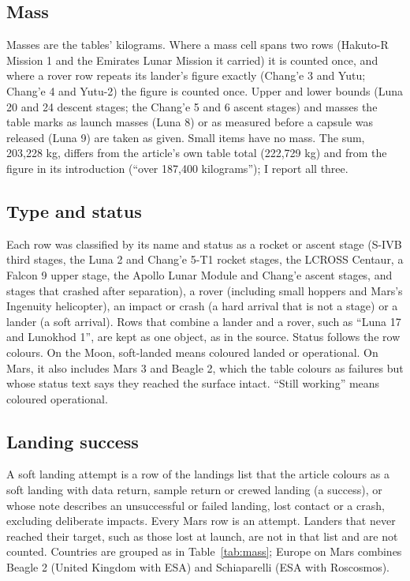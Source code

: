 \documentclass[11pt,a4paper]{article}
\begin{document}
\subsection{Mass}
Masses are the tables' kilograms. Where a mass cell spans two rows (Hakuto-R Mission 1 and the Emirates Lunar Mission it carried) it is counted once, and where a rover row repeats its lander's figure exactly (Chang'e 3 and Yutu; Chang'e 4 and Yutu-2) the figure is counted once. Upper and lower bounds (Luna 20 and 24 descent stages; the Chang'e 5 and 6 ascent stages) and masses the table marks as launch masses (Luna 8) or as measured before a capsule was released (Luna 9) are taken as given. Small items have no mass. The sum, 203,228 kg, differs from the article's own table total (222,729 kg) and from the figure in its introduction (``over 187,400 kilograms''); I report all three.

\subsection{Type and status}
Each row was classified by its name and status as a rocket or ascent stage (S-IVB third stages, the Luna 2 and Chang'e 5-T1 rocket stages, the LCROSS Centaur, a Falcon 9 upper stage, the Apollo Lunar Module and Chang'e ascent stages, and stages that crashed after separation), a rover (including small hoppers and Mars's Ingenuity helicopter), an impact or crash (a hard arrival that is not a stage) or a lander (a soft arrival). Rows that combine a lander and a rover, such as ``Luna 17 and Lunokhod 1'', are kept as one object, as in the source. Status follows the row colours. On the Moon, soft-landed means coloured landed or operational. On Mars, it also includes Mars 3 and Beagle 2, which the table colours as failures but whose status text says they reached the surface intact. ``Still working'' means coloured operational.

\subsection{Landing success}
A soft landing attempt is a row of the landings list that the article colours as a soft landing with data return, sample return or crewed landing (a success), or whose note describes an unsuccessful or failed landing, lost contact or a crash, excluding deliberate impacts. Every Mars row is an attempt. Landers that never reached their target, such as those lost at launch, are not in that list and are not counted. Countries are grouped as in Table~\ref{tab:mass}; Europe on Mars combines Beagle 2 (United Kingdom with ESA) and Schiaparelli (ESA with Roscosmos).
\end{document}
